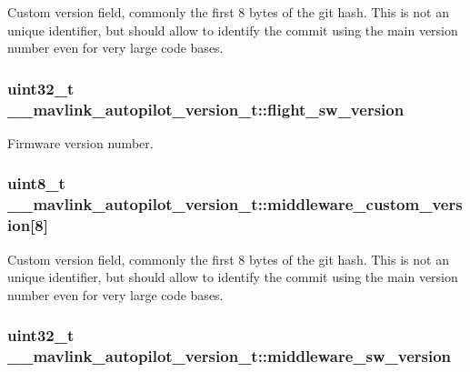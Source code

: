Custom version field, commonly the first 8 bytes of the git hash. This is not an unique identifier, but should allow to identify the commit using the main version number even for very large code bases. 

\hypertarget{struct____mavlink__autopilot__version__t_a18da1ad779dd4f54f87231ea355e79f4}{
\subsubsection[{flight\+\_\+sw\+\_\+version}]{\setlength{\rightskip}{0pt plus 5cm}uint32\+\_\+t \+\_\+\+\_\+mavlink\+\_\+autopilot\+\_\+version\+\_\+t\+::flight\+\_\+sw\+\_\+version}}\label{struct____mavlink__autopilot__version__t_a18da1ad779dd4f54f87231ea355e79f4}


Firmware version number. 

\hypertarget{struct____mavlink__autopilot__version__t_a2976ac188326bfcc489713bd00845848}{
\subsubsection[{middleware\+\_\+custom\+\_\+version}]{\setlength{\rightskip}{0pt plus 5cm}uint8\+\_\+t \+\_\+\+\_\+mavlink\+\_\+autopilot\+\_\+version\+\_\+t\+::middleware\+\_\+custom\+\_\+version\mbox{[}8\mbox{]}}}\label{struct____mavlink__autopilot__version__t_a2976ac188326bfcc489713bd00845848}


Custom version field, commonly the first 8 bytes of the git hash. This is not an unique identifier, but should allow to identify the commit using the main version number even for very large code bases. 

\hypertarget{struct____mavlink__autopilot__version__t_af3db01348e485516330cd2096348767b}{
\subsubsection[{middleware\+\_\+sw\+\_\+version}]{\setlength{\rightskip}{0pt plus 5cm}uint32\+\_\+t \+\_\+\+\_\+mavlink\+\_\+autopilot\+\_\+version\+\_\+t\+::middleware\+\_\+sw\+\_\+version}}\label{struct____mavlink__autopilot__version__t_af3db01348e485516330cd2096348767b}


